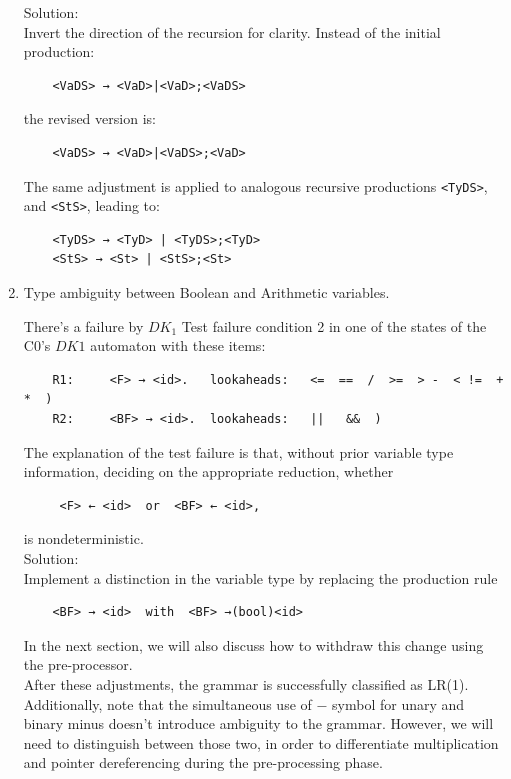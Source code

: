 \begin{enumerate}
    Solution: \\
    Invert the direction of the recursion for clarity. Instead of the initial production:
    \begin{verbatim}
    <VaDS> → <VaD>|<VaD>;<VaDS>
    \end{verbatim}
    the revised version is:
    \begin{verbatim}
    <VaDS> → <VaD>|<VaDS>;<VaD>
    \end{verbatim}

    The same adjustment is applied to analogous recursive productions \texttt{<TyDS>}, and \texttt{<StS>}, leading to:
    \begin{verbatim}
    <TyDS> → <TyD> | <TyDS>;<TyD>
    <StS> → <St> | <StS>;<St>
    \end{verbatim}

    \item Type ambiguity between Boolean and Arithmetic variables.

    There’s a failure by \({DK_{1}}\) Test failure condition 2 in one of the states of the C0's \(DK1\) automaton with these items:
    \begin{verbatim}
    R1:		<F> → <id>.   lookaheads:   <=  ==  /  >=  > -  < !=  +  *  )
    R2:		<BF> → <id>.  lookaheads:   ||   &&  )
    \end{verbatim}
    The explanation of the test failure is that, without prior variable type information, deciding on the appropriate reduction, whether
    \begin{verbatim}
     <F> ← <id>  or  <BF> ← <id>,
    \end{verbatim}
    is nondeterministic.\\

    Solution: \\
    Implement a distinction in the variable type by replacing the production rule
    \begin{verbatim}
    <BF> → <id>  with  <BF> →(bool)<id>
    \end{verbatim}

    In the next section, we will also discuss how to withdraw this change using the pre-processor.\\

    After these adjustments, the grammar is successfully classified as LR(1). Additionally, note that the simultaneous use of \(-\) symbol for unary and binary minus doesn’t introduce ambiguity to the grammar. However, we will need to distinguish between those two, in order to differentiate multiplication and pointer dereferencing during the pre-processing phase.
\end{enumerate}

